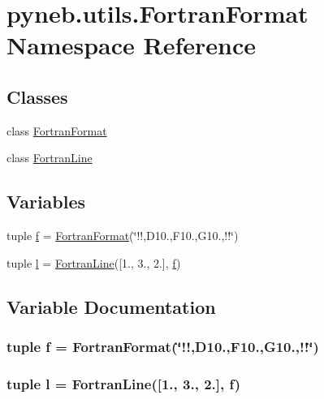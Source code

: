 \hypertarget{namespacepyneb_1_1utils_1_1_fortran_format}{}\section{pyneb.\+utils.\+Fortran\+Format Namespace Reference}
\label{namespacepyneb_1_1utils_1_1_fortran_format}
\subsection*{Classes}
\begin{DoxyCompactItemize}
\item 
class \hyperlink{classpyneb_1_1utils_1_1_fortran_format_1_1_fortran_format}{Fortran\+Format}
\item 
class \hyperlink{classpyneb_1_1utils_1_1_fortran_format_1_1_fortran_line}{Fortran\+Line}
\end{DoxyCompactItemize}
\subsection*{Variables}
\begin{DoxyCompactItemize}
\item 
tuple \hyperlink{namespacepyneb_1_1utils_1_1_fortran_format_a85d897846bb64fe74a8ce36c2365e3b8}{f} = \hyperlink{classpyneb_1_1utils_1_1_fortran_format_1_1_fortran_format}{Fortran\+Format}(\char`\"{}\textquotesingle{}!!\textquotesingle{},D10.,F10.,G10.,\textquotesingle{}!!\textquotesingle{}\char`\"{})
\item 
tuple \hyperlink{namespacepyneb_1_1utils_1_1_fortran_format_abc599b1f87ca3a4e0ff709091fb25176}{l} = \hyperlink{classpyneb_1_1utils_1_1_fortran_format_1_1_fortran_line}{Fortran\+Line}(\mbox{[}1., 3., 2.\mbox{]}, \hyperlink{namespacepyneb_1_1utils_1_1_fortran_format_a85d897846bb64fe74a8ce36c2365e3b8}{f})
\end{DoxyCompactItemize}


\subsection{Variable Documentation}
\hypertarget{namespacepyneb_1_1utils_1_1_fortran_format_a85d897846bb64fe74a8ce36c2365e3b8}{}
\subsubsection[{f}]{\setlength{\rightskip}{0pt plus 5cm}tuple f = {\bf Fortran\+Format}(\char`\"{}\textquotesingle{}!!\textquotesingle{},D10.,F10.,G10.,\textquotesingle{}!!\textquotesingle{}\char`\"{})}\label{namespacepyneb_1_1utils_1_1_fortran_format_a85d897846bb64fe74a8ce36c2365e3b8}
\hypertarget{namespacepyneb_1_1utils_1_1_fortran_format_abc599b1f87ca3a4e0ff709091fb25176}{}
\subsubsection[{l}]{\setlength{\rightskip}{0pt plus 5cm}tuple l = {\bf Fortran\+Line}(\mbox{[}1., 3., 2.\mbox{]}, {\bf f})}\label{namespacepyneb_1_1utils_1_1_fortran_format_abc599b1f87ca3a4e0ff709091fb25176}

